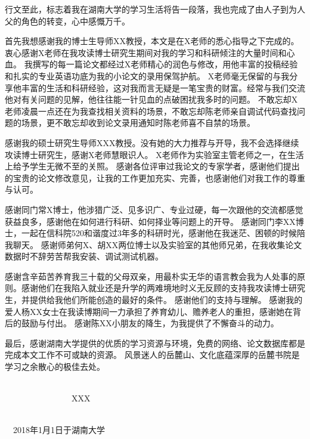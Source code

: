 \begin{acknowledgements}
行文至此，标志着我在湖南大学的学习生活将告一段落，我也完成了由人子到为人父的角色的转变，心中感慨万千。

首先我想感谢我的博士生导师XX教授，本文是在X老师的悉心指导之下完成的。
衷心感谢X老师在我攻读博士研究生期间对我的学习和科研倾注的大量时间和心血。
我撰写的每一篇论文都经过X老师精心的润色与修改，用他丰富的投稿经验和扎实的专业英语功底为我的小论文的录用保驾护航。
X老师毫无保留的与我分享他丰富的生活和科研经验，这对我而言无疑是一笔宝贵的财富。经常与我们交流他对有关问题的见解，他往往能一针见血的点破困扰我多时的问题。
不敢忘却X老师凌晨一点还在为我查找相关资料的场景，不敢忘却陈老师亲自调试代码查找问题的场景，更不敢忘却收到论文录用通知时陈老师喜不自禁的场景。

感谢我的硕士研究生导师XXX教授。没有她的大力推荐与开导，我不会选择继续攻读博士研究生，感谢X老师慧眼识人。
X老师作为实验室主管老师之一，在生活上给予学生无微不至的关照。
感谢各位评审过我论文的专家学者，感谢他们提出的宝贵的论文修改意见，让我的工作更加充实、完善，也感谢他们对我工作的尊重与认可。

感谢同门常X博士，他涉猎广泛、见多识广、专业过硬，每一次跟他的交流都感觉获益良多，感谢他在如何进行科研、如何择业等问题上的开导。
感谢同门李XX博士，一起在信科院520和谐度过3年多的科研时光，感谢他在我迷茫、困顿的时候陪我聊天。
感谢师弟何X、胡XX两位博士以及实验室的其他师兄弟，在我收集论文数据时不辞劳苦帮我安装、调试测试机器。

感谢含辛茹苦养育我三十载的父母双亲，用最朴实无华的语言教会我为人处事的原则。感谢他们在我陷入就业还是升学的两难境地时义无反顾的支持我攻读博士研究生，并提供给我他们所能创造的最好的条件。
感谢他们的支持与理解。
感谢我的爱人杨XX女士在我读博期间一力承担了养育幼儿、赡养老人的重担，感谢她在背后的鼓励与付出。
感谢陈XX小朋友的降生，为我提供了不懈奋斗的动力。

最后，感谢湖南大学提供的优质的学习资源与环境，免费的网络、论文数据库都是完成本文工作不可或缺的资源。
风景迷人的岳麓山、文化底蕴深厚的岳麓书院是学习之余散心的极佳去处。
~
~

~~~~~~~~~~~~~~~~~~~~~~~~~~~~~~~~~~~~~~~~~~~~~~~~~~~~~~~~~~~~~~~~~~~~~~~~~~~~~~~~~~~~~~~~XXX

~~~~~~~~~~~~~~~~~~~~~~~~~~~~~~~~~~~~~~~~~~~~~~~~~~~~~~~~~~~~~~~~~~~~~~~~~~2018年1月1日于湖南大学
\end{acknowledgements}

